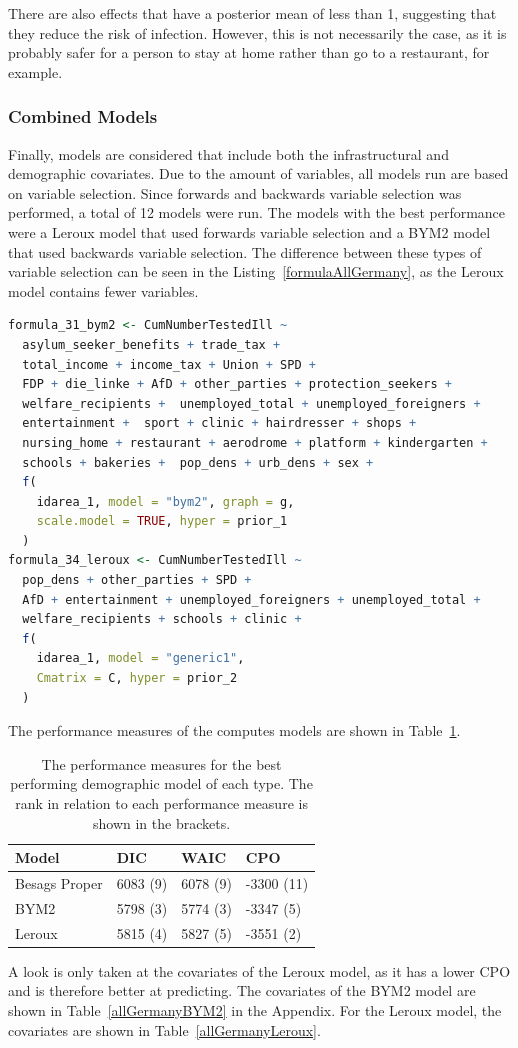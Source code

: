There are also effects that have a posterior mean of less than 1, suggesting that they reduce the risk of infection. However, this is not necessarily the case, as it is probably safer for a person to stay at home rather than go to a restaurant, for example.
\subsubsection{Combined Models}
Finally, models are considered that include both the infrastructural and demographic covariates. Due to the amount of variables, all models run are based on variable selection. Since forwards and backwards variable selection was performed, a total of 12 models were run. The models with the best performance were a Leroux model that used forwards variable selection and a BYM2 model that used backwards variable selection. The difference between these types of variable selection can be seen in the Listing~\ref{formulaAllGermany}, as the Leroux model contains fewer variables.
\begin{lstlisting}[caption={The formulas for the best models containing all variables.}, label={formulaAllGermany}, language=R]
formula_31_bym2 <- CumNumberTestedIll ~
  asylum_seeker_benefits + trade_tax + 
  total_income + income_tax + Union + SPD + 
  FDP + die_linke + AfD + other_parties + protection_seekers +
  welfare_recipients +  unemployed_total + unemployed_foreigners +
  entertainment +  sport + clinic + hairdresser + shops +
  nursing_home + restaurant + aerodrome + platform + kindergarten +
  schools + bakeries +  pop_dens + urb_dens + sex +
  f(
    idarea_1, model = "bym2", graph = g,
    scale.model = TRUE, hyper = prior_1
  )
formula_34_leroux <- CumNumberTestedIll ~ 
  pop_dens + other_parties + SPD + 
  AfD + entertainment + unemployed_foreigners + unemployed_total + 
  welfare_recipients + schools + clinic +
  f(
    idarea_1, model = "generic1",
    Cmatrix = C, hyper = prior_2
  )
\end{lstlisting}
The performance measures of the computes models are shown in Table~\ref{allGermany}.
\begin{table}[H] 
\caption{The performance measures for the best performing demographic model of each type. The rank in relation to each performance measure is shown in the brackets. \label{allGermany}}
\begin{tabular}{l l l l}
\toprule
\textbf{Model}	& \textbf{DIC}	& \textbf{WAIC} & \textbf{CPO} \\
\midrule
Besags Proper & 6083 (9) & 6078 (9) & -3300 (11)\\
BYM2 & 5798 (3) & 5774 (3) & -3347 (5)\\
Leroux & 5815 (4) & 5827 (5) & -3551 (2) \\
\bottomrule
\end{tabular}
\end{table}
A look is only taken at the covariates of the Leroux model, as it has a lower CPO and is therefore better at predicting. The covariates of the BYM2 model are shown in Table~\ref{allGermanyBYM2} in the Appendix. For the Leroux model, the covariates are shown in Table~\ref{allGermanyLeroux}.

